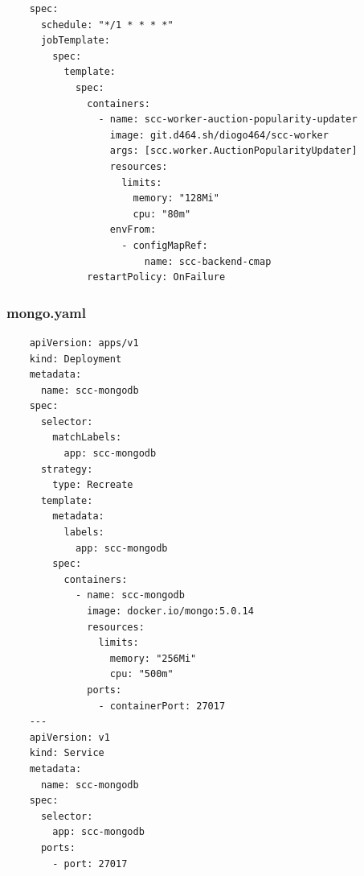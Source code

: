 \documentclass[runningheads]{llncs}
\begin{document}
\begin{verbatim}
    spec:
      schedule: "*/1 * * * *"
      jobTemplate:
        spec:
          template:
            spec:
              containers:
                - name: scc-worker-auction-popularity-updater
                  image: git.d464.sh/diogo464/scc-worker
                  args: [scc.worker.AuctionPopularityUpdater]
                  resources:
                    limits:
                      memory: "128Mi"
                      cpu: "80m"
                  envFrom:
                    - configMapRef:
                        name: scc-backend-cmap
              restartPolicy: OnFailure
\end{verbatim}


\subsubsection{mongo.yaml}
\begin{verbatim}
    apiVersion: apps/v1
    kind: Deployment
    metadata:
      name: scc-mongodb
    spec:
      selector:
        matchLabels:
          app: scc-mongodb
      strategy:
        type: Recreate
      template:
        metadata:
          labels:
            app: scc-mongodb
        spec:
          containers:
            - name: scc-mongodb
              image: docker.io/mongo:5.0.14
              resources:
                limits:
                  memory: "256Mi"
                  cpu: "500m"
              ports:
                - containerPort: 27017
    ---
    apiVersion: v1
    kind: Service
    metadata:
      name: scc-mongodb
    spec:
      selector:
        app: scc-mongodb
      ports:
        - port: 27017
    
\end{verbatim}
\end{document}
